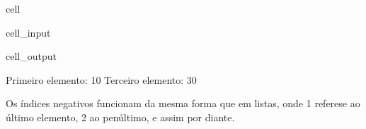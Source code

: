 \documentclass[letterpaper,10pt,english]{jupyterBook}
\begin{document}
\begin{sphinxuseclass}{cell}\begin{sphinxVerbatimInput}

\begin{sphinxuseclass}{cell_input}
\begin{sphinxVerbatim}[commandchars=\\\{\}]
      

  \PYG{p}{[}\PYG{p}{]}
  \PYG{p}{[}\PYG{p}{]}

 
 
\end{sphinxVerbatim}

\end{sphinxuseclass}\end{sphinxVerbatimInput}
\begin{sphinxVerbatimOutput}

\begin{sphinxuseclass}{cell_output}
\begin{sphinxVerbatim}[commandchars=\\\{\}]
Primeiro elemento: 10
Terceiro elemento: 30
\end{sphinxVerbatim}

\end{sphinxuseclass}\end{sphinxVerbatimOutput}

\end{sphinxuseclass}
\sphinxAtStartPar
{}
Os índices negativos funcionam da mesma forma que em listas, onde \sphinxhyphen{}1 refere\sphinxhyphen{}se ao último elemento, \sphinxhyphen{}2 ao penúltimo, e assim por diante.
\end{document}
